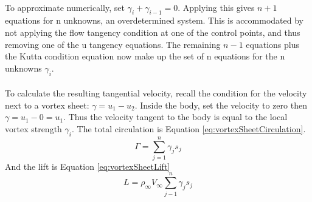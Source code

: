\documentclass[draft=false, titlepage]{article}
\begin{document}
\paragraph*{} To approximate numerically, set $\gamma_i + \gamma_{i-1}=0$. Applying this gives $n+1$ equations for n unknowns, an overdetermined system. This is accommodated by not applying the flow tangency condition at one of the control points, and thus removing one of the u tangency equations. The remaining $n-1$ equations plus the Kutta condition equation now make up the set of n equations for the n unknowns $\gamma_i$.
\paragraph*{} To calculate the resulting tangential velocity, recall the condition for the velocity next to a vortex sheet: $\gamma = u_1-u_2$. Inside the body, set the velocity to zero then $\gamma = u_1 - 0 = u_1$. Thus the velocity tangent to the body is equal to the local vortex strength $\gamma_i$. The total circulation is Equation \ref{eq:vortexSheetCirculation}.
\begin{equation}
    \Gamma = \sum_{j=1}^n \gamma_j s_j
    \label{eq:vortexSheetCirculation}
\end{equation}
And the lift is Equation \ref{eq:vortexSheetLift}
\begin{equation}
    L = \rho_\infty V_\infty \sum_{j-1}^n \gamma_j s_j
    \label{eq:vortexSheetLift}
\end{equation}
\end{document}
